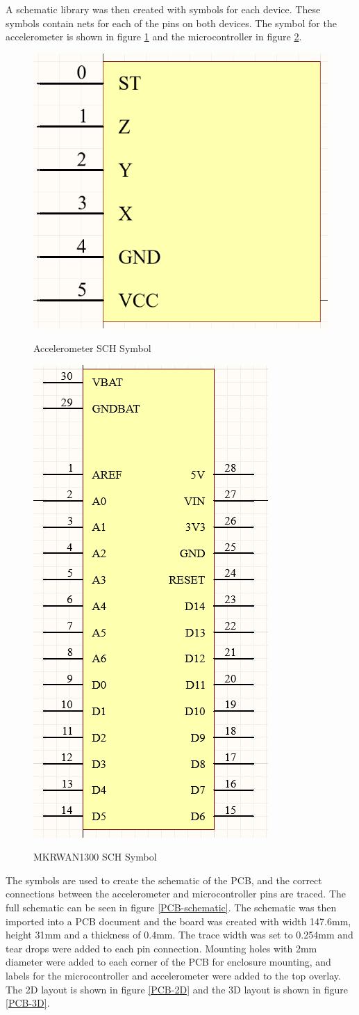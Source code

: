 \clearpage

A schematic library was then created with symbols for each device. These symbols contain nets for each of the pins on both devices. The symbol for the accelerometer is shown in figure \ref{accel-symbol} and the microcontroller in figure \ref{micro-symbol}. 

\begin{figure}[H]
	\centering
	\caption{Accelerometer SCH Symbol}
	\includegraphics[width=.4\textwidth]{Sections/Design-Process/accel-symbol.png}
	\label{accel-symbol}
\end{figure}

\begin{figure}[H]
	\centering
	\caption{MKRWAN1300 SCH Symbol}	
	\includegraphics[width=.3\textwidth]{Sections/Design-Process/micro-symbol.png}
	\label{micro-symbol}
\end{figure}

The symbols are used to create the schematic of the PCB, and the correct connections between the accelerometer and microcontroller pins are traced. The full schematic can be seen in figure \ref{PCB-schematic}. The schematic was then imported into a PCB document and the board was created with width 147.6mm, height 31mm and a thickness of 0.4mm. The trace width was set to 0.254mm and tear drops were added to each pin connection. Mounting holes with 2mm diameter were added to each corner of the PCB for enclosure mounting, and labels for the microcontroller and accelerometer were added to the top overlay. The 2D layout is shown in figure \ref{PCB-2D} and the 3D layout is shown in figure \ref{PCB-3D}.

